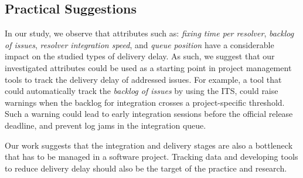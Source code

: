 \subsection{Practical Suggestions}

In our study, we observe that attributes such as: \textit{fixing time per
resolver}, \textit{backlog of issues}, \textit{resolver integration speed}, and
\textit{queue position} have a considerable impact on the studied types of
delivery delay. As such, we suggest that our investigated attributes could be
used as a starting point in project management tools to track the delivery
delay of addressed issues. For example, a tool that could automatically track the
\textit{backlog of issues} by using the ITS, could raise warnings when the
backlog for integration crosses a project-specific threshold. Such a warning
could lead to early integration sessions before the official release deadline,
and prevent log jams in the integration queue. 

Our work suggests that the integration and delivery stages are also a bottleneck
that has to be managed in a software project. Tracking data and developing tools
to reduce delivery delay should also be the target of the practice and research.


